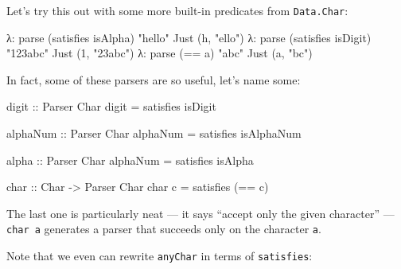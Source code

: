 \documentclass[]{article}
\newenvironment{Shaded}{}{}
\newcommand{\CharTok}[1]{\textcolor[rgb]{0.25,0.44,0.63}{#1}}
\newcommand{\DataTypeTok}[1]{\textcolor[rgb]{0.56,0.13,0.00}{#1}}
\newcommand{\FunctionTok}[1]{\textcolor[rgb]{0.02,0.16,0.49}{#1}}
\newcommand{\NormalTok}[1]{#1}
\newcommand{\OperatorTok}[1]{\textcolor[rgb]{0.40,0.40,0.40}{#1}}
\newcommand{\OtherTok}[1]{\textcolor[rgb]{0.00,0.44,0.13}{#1}}
\newcommand{\StringTok}[1]{\textcolor[rgb]{0.25,0.44,0.63}{#1}}
\begin{document}
Let's try this out with some more built-in predicates from \texttt{Data.Char}:

\begin{Shaded}
\begin{Highlighting}[]
\NormalTok{λ}\OperatorTok{:}\NormalTok{ parse (satisfies }\FunctionTok{isAlpha}\NormalTok{) }\StringTok{"hello"}
\DataTypeTok{Just}\NormalTok{ (}\CharTok{\textquotesingle{}h\textquotesingle{}}\NormalTok{, }\StringTok{"ello"}\NormalTok{)}
\NormalTok{λ}\OperatorTok{:}\NormalTok{ parse (satisfies }\FunctionTok{isDigit}\NormalTok{) }\StringTok{"123abc"}
\DataTypeTok{Just}\NormalTok{ (}\CharTok{\textquotesingle{}1\textquotesingle{}}\NormalTok{, }\StringTok{"23abc"}\NormalTok{)}
\NormalTok{λ}\OperatorTok{:}\NormalTok{ parse (}\OperatorTok{==} \CharTok{\textquotesingle{}a\textquotesingle{}}\NormalTok{) }\StringTok{"abc"}
\DataTypeTok{Just}\NormalTok{ (}\CharTok{\textquotesingle{}a\textquotesingle{}}\NormalTok{, }\StringTok{"bc"}\NormalTok{)}
\end{Highlighting}
\end{Shaded}

In fact, some of these parsers are so useful, let's name some:

\begin{Shaded}
\begin{Highlighting}[]
\OtherTok{digit ::} \DataTypeTok{Parser} \DataTypeTok{Char}
\NormalTok{digit }\OtherTok{=}\NormalTok{ satisfies }\FunctionTok{isDigit}

\OtherTok{alphaNum ::} \DataTypeTok{Parser} \DataTypeTok{Char}
\NormalTok{alphaNum }\OtherTok{=}\NormalTok{ satisfies }\FunctionTok{isAlphaNum}

\OtherTok{alpha ::} \DataTypeTok{Parser} \DataTypeTok{Char}
\NormalTok{alphaNum }\OtherTok{=}\NormalTok{ satisfies }\FunctionTok{isAlpha}

\OtherTok{char ::} \DataTypeTok{Char} \OtherTok{{-}\textgreater{}} \DataTypeTok{Parser} \DataTypeTok{Char}
\NormalTok{char c }\OtherTok{=}\NormalTok{ satisfies (}\OperatorTok{==}\NormalTok{ c)}
\end{Highlighting}
\end{Shaded}

The last one is particularly neat --- it says ``accept only the given
character'' --- \texttt{char\ \textquotesingle{}a\textquotesingle{}} generates a
parser that succeeds only on the character \texttt{a}.

Note that we even can rewrite \texttt{anyChar} in terms of \texttt{satisfies}:
\end{document}
